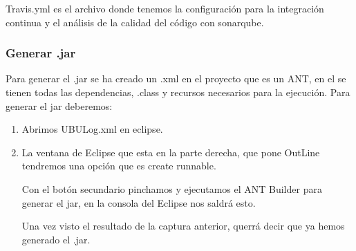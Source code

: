 Travis.yml es el archivo donde tenemos la configuración para la integración continua y el análisis de la calidad del código con sonarqube. \cite{web:travis} \cite{Web:sonarqube}

\subsubsection{Generar .jar}\label{generar-jar}

Para generar el .jar se ha creado un .xml en el proyecto que es un ANT, en el se tienen todas las dependencias, .class y recursos necesarios para la ejecución. Para generar el jar deberemos:

\begin{enumerate}
	\tightlist
	\item
	Abrimos UBULog.xml en eclipse.
	\item
	La ventana de Eclipse que esta en la parte derecha, que pone OutLine tendremos una opción que es create runnable.
	
	
	Con el botón secundario pinchamos y ejecutamos el ANT Builder para generar el jar, en la consola del Eclipse nos saldrá esto.
	
	
	Una vez visto el resultado de la captura anterior, querrá decir que ya hemos generado el .jar.
	
\end{enumerate}

